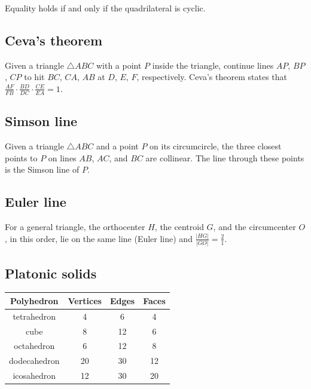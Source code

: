 Equality holds if and only if the quadrilateral is cyclic.

\subsection{Ceva's theorem}
Given a triangle $\triangle ABC$ with a point $P$ inside the triangle,
continue lines $AP$, $BP$, $CP$ to hit $BC$, $CA$, $AB$ at $D$, $E$, $F$,
respectively.
Ceva's theorem states that
$\frac{AF}{FB} \cdot \frac{BD}{DC} \cdot \frac{CE}{EA} = 1$. 

\subsection{Simson line}
Given a triangle $\triangle ABC$ and a point $P$ on its circumcircle,
the three closest points to $P$ on lines $AB$, $AC$, and $BC$ are collinear.
The line through these points is the Simson line of $P$.

\subsection{Euler line}
For a general triangle, the orthocenter $H$, the centroid $G$, 
and the circumcenter $O$, in this order, lie on the same line (Euler line) 
and $\frac{|HG|}{|GO|} = \frac{2}{1}$.

\subsection{Platonic solids}
\begin{tabular}{ |c|c|c|c| } 
\hline
Polyhedron & Vertices & Edges & Faces \\ 
\hline
tetrahedron & 4 & 6 & 4 \\ 
\hline
cube & 8 & 12 & 6 \\ 
\hline
octahedron & 6 & 12 & 8 \\
\hline
dodecahedron & 20 & 30 & 12 \\
\hline
icosahedron & 12 & 30 & 20 \\
\hline
\end{tabular}
 

